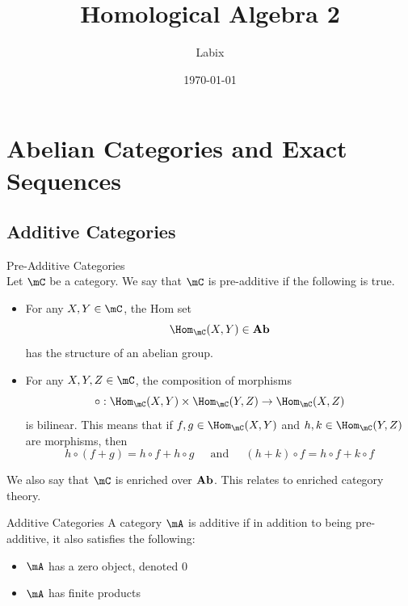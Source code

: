 \documentclass[a4paper]{article}
\title{Homological Algebra 2}
\author{Labix}
\date{\today}
\begin{document}
\maketitle
\begin{abstract}
\end{abstract}
\pagebreak
\tableofcontents

\pagebreak
\section{Abelian Categories and Exact Sequences}
\subsection{Additive Categories}
\begin{defn}{Pre-Additive Categories}{}\\
Let $\mC$ be a category. We say that $\mC$ is pre-additive if the following is true. 
\begin{itemize}
\item For any $X,Y\in\mC$, the Hom set $$\Hom_\mC(X,Y)\in\bold{Ab}$$ has the structure of an abelian group. 
\item For any $X,Y,Z\in\mC$, the composition of morphisms $$\circ:\Hom_\mC(X,Y)\times\Hom_\mC(Y,Z)\to\Hom_\mC(X,Z)$$ is bilinear. This means that if $f,g\in\Hom_\mC(X,Y)$ and $h,k\in\Hom_\mC(Y,Z)$ are morphisms, then $$h\circ(f+g)=h\circ f+h\circ g\;\;\;\;\text{ and }\;\;\;\;(h+k)\circ f=h\circ f+k\circ f$$
\end{itemize}
\end{defn}

We also say that $\mC$ is enriched over $\bold{Ab}$. This relates to enriched category theory. 

\begin{defn}{Additive Categories}{} A category $\mA$ is additive if in addition to being pre-additive, it also satisfies the following: 
\begin{itemize}
\item $\mA$ has a zero object, denoted $0$
\item $\mA$ has finite products
\end{itemize}
\end{defn}
\end{document}
